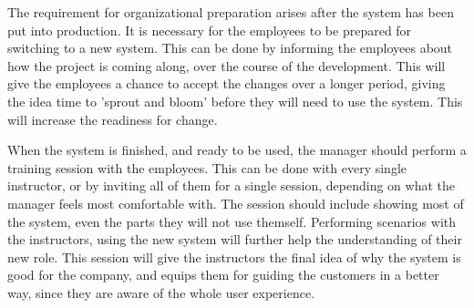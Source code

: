 The requirement for organizational preparation arises after the system has been
put into production. It is necessary for the employees to be prepared for
switching to a new system. This can be done by informing the employees about how the project is coming along, over 
the course of the development. This will give the employees a chance to accept 
the changes over a longer period, 
giving the idea time to 'sprout and bloom' before they will need to use the 
system. This will increase the readiness for change.

When the system is finished, and ready to be used, the manager should perform
a training session with the employees. This can be done with every single
instructor, or by inviting all of them for a single session, depending on what
the manager feels most comfortable with. The session should include showing most of 
the system, even the parts they will not use themself. Performing scenarios
with the instructors, using the new system will further help the understanding
of their new role. This session will give the instructors the final idea
of why the system is good for the company, and equips them for guiding the 
customers in a better way, since they are aware of the whole user experience.

\newpage
